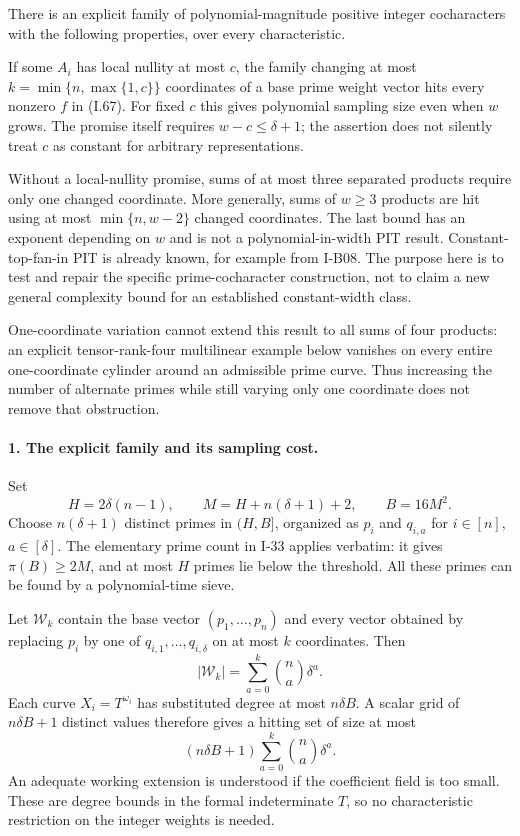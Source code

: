 \documentclass[11pt,a4paper]{article}
\theoremstyle{definition}\newtheorem{definition}{Definition}
\begin{document}
There is an explicit family of polynomial-magnitude positive
integer cocharacters with the following properties, over every
characteristic.

If some $A_i$ has local nullity at most $c$, the family changing
at most $k=\min\{n,\max\{1,c\}\}$ coordinates of a base prime
weight vector hits every nonzero $f$ in (I.67). For fixed $c$
this gives polynomial sampling size even when $w$ grows. The
promise itself requires $w-c\le\delta+1$; the assertion does not
silently treat $c$ as constant for arbitrary representations.

Without a local-nullity promise, sums of at most three separated
products require only one changed coordinate. More generally,
sums of $w\ge3$ products are hit using at most
$\min\{n,w-2\}$ changed coordinates. The last bound has an
exponent depending on $w$ and is not a polynomial-in-width PIT
result. Constant-top-fan-in PIT is already known, for example
from I-B08. The purpose here is to test and repair the specific
prime-cocharacter construction, not to claim a new general
complexity bound for an established constant-width class.

One-coordinate variation cannot extend this result to all sums
of four products: an explicit tensor-rank-four multilinear
example below vanishes on every entire one-coordinate cylinder
around an admissible prime curve. Thus increasing the number of
alternate primes while still varying only one coordinate does
not remove that obstruction.

\paragraph{1. The explicit family and its sampling cost.}
Set
\[
 H=2\delta(n-1),\qquad
 M=H+n(\delta+1)+2,\qquad B=16M^2.
\]
Choose $n(\delta+1)$ distinct primes in $(H,B]$, organized as
$p_i$ and $q_{i,a}$ for $i\in[n]$, $a\in[\delta]$.
The elementary prime count in I-33 applies verbatim: it gives
$\pi(B)\ge2M$, and at most $H$ primes lie below the threshold.
All these primes can be found by a polynomial-time sieve.

Let $\mathcal W_k$ contain the base vector $(p_1,\ldots,p_n)$
and every vector obtained by replacing $p_i$ by one of
$q_{i,1},\ldots,q_{i,\delta}$ on at most $k$ coordinates.
Then
\[
 |\mathcal W_k|=
 \sum_{a=0}^{k}\binom na\delta^a.
 \tag{I.68}
\]
Each curve $X_i=T^{\omega_i}$ has substituted degree at most
$n\delta B$. A scalar grid of $n\delta B+1$ distinct values
therefore gives a hitting set of size at most
\[
 (n\delta B+1)\sum_{a=0}^{k}\binom na\delta^a.
 \tag{I.69}
\]
An adequate working extension is understood if the coefficient
field is too small. These are degree bounds in the formal
indeterminate $T$, so no characteristic restriction on the
integer weights is needed.
\end{document}
